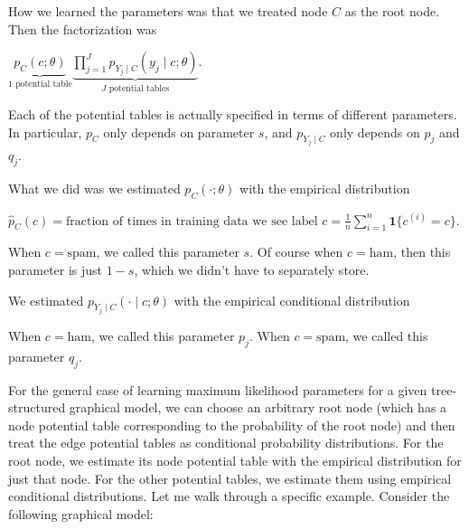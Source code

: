 How we learned the parameters was that we treated node $C$ as the root node. Then the factorization was

{\centering$\underbrace{p_{C}(c;\theta )}_{\text {1 potential table}}\underbrace{\prod _{j=1}^{J}p_{Y_{j}\mid C}(y_{j}\mid c;\theta )}_{J\text { potential tables}}.$ \par}
 
Each of the potential tables is actually specified in terms of different parameters. In particular, $p_C$ only depends on parameter $s$, and $p_{Y_{j}\mid C}$ only depends on $p_j$ and $q_j$.

What we did was we estimated $p_{C}(\cdot ;\theta )$ with the empirical distribution

{\centering$\widehat{p}_{C}(c)=\text {fraction of times in training data we see label }c=\frac{1}{n}\sum _{i=1}^{n}\mathbf{1}\{ c^{(i)}=c\} .$ \par}
 
When $c=\text {spam}$, we called this parameter $s$. Of course when $c=\text {ham}$, then this parameter is just $1-s$, which we didn't have to separately store.

We estimated $p_{Y_{j}\mid C}(\cdot \mid c;\theta )$ with the empirical conditional distribution

{ \par}

When $c=\text {ham}$, we called this parameter $p_j$. When $c=\text {spam}$, we called this parameter $q_j$.

For the general case of learning maximum likelihood parameters for a given tree-structured graphical model, we can choose an arbitrary root node (which has a node potential table corresponding to the probability of the root node) and then treat the edge potential tables as conditional probability distributions. For the root node, we estimate its node potential table with the empirical distribution for just that node. For the other potential tables, we estimate them using empirical conditional distributions. Let me walk through a specific example. Consider the following graphical model:

